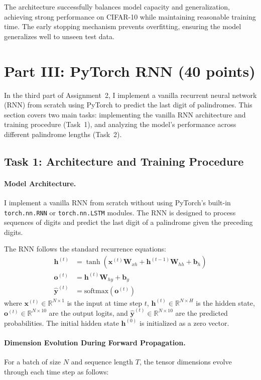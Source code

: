 \documentclass[11pt,a4paper]{article}
\begin{document}
The architecture successfully balances model capacity and generalization, achieving strong performance on CIFAR-10 while maintaining reasonable training time. The early stopping mechanism prevents overfitting, ensuring the model generalizes well to unseen test data.

\section{Part III: PyTorch RNN (40 points)}
In the third part of Assignment~2, I implement a vanilla recurrent neural network (RNN) from scratch using PyTorch to predict the last digit of palindromes. This section covers two main tasks: implementing the vanilla RNN architecture and training procedure (Task~1), and analyzing the model's performance across different palindrome lengths (Task~2).

\subsection{Task 1: Architecture and Training Procedure}
\paragraph{Model Architecture.} I implement a vanilla RNN from scratch without using PyTorch's built-in \texttt{torch.nn.RNN} or \texttt{torch.nn.LSTM} modules. The RNN is designed to process sequences of digits and predict the last digit of a palindrome given the preceding digits.

The RNN follows the standard recurrence equations:
\begin{align*}
\mathbf{h}^{(t)} &= \tanh(\mathbf{x}^{(t)} \mathbf{W}_{xh} + \mathbf{h}^{(t-1)} \mathbf{W}_{hh} + \mathbf{b}_h) \\
\mathbf{o}^{(t)} &= \mathbf{h}^{(t)} \mathbf{W}_{hy} + \mathbf{b}_y \\
\hat{\mathbf{y}}^{(t)} &= \text{softmax}(\mathbf{o}^{(t)})
\end{align*}
where $\mathbf{x}^{(t)} \in \mathbb{R}^{N \times 1}$ is the input at time step $t$, $\mathbf{h}^{(t)} \in \mathbb{R}^{N \times H}$ is the hidden state, $\mathbf{o}^{(t)} \in \mathbb{R}^{N \times 10}$ are the output logits, and $\hat{\mathbf{y}}^{(t)} \in \mathbb{R}^{N \times 10}$ are the predicted probabilities. The initial hidden state $\mathbf{h}^{(0)}$ is initialized as a zero vector.

\paragraph{Dimension Evolution During Forward Propagation.} For a batch of size $N$ and sequence length $T$, the tensor dimensions evolve through each time step as follows:
\end{document}
